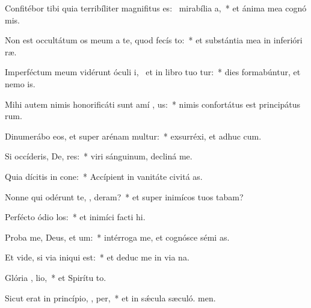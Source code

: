 \item Confitébor tibi quia terribíliter magnifitus es:~\pscross{} mirabília  a,~* et ánima mea cognó mis.
\item Non est occultátum os meum a te, quod fecís  to:~* et substántia mea in inferióri ræ.
\item Imperféctum meum vidérunt óculi i,~\pscross{} et in libro tuo  tur:~* dies formabúntur, et nemo  is.
\item Mihi autem nimis honorificáti sunt amí , us:~* nimis confortátus est principátus rum.
\item Dinumerábo eos, et super arénam multur:~* exsurréxi, et adhuc  cum.
\item Si occíderis, De, res:~* viri sánguinum, decliná  me.
\item Quia dícitis in cone:~* Accípient in vanitáte civitá as.
\item Nonne qui odérunt te, , deram?~* et super inimícos tuos tabam?
\item Perfécto ódio  los:~* et inimíci facti  hi.
\item Proba me, Deus, et   um:~* intérroga me, et cognósce sémi as.
\item Et vide, si via iniqui   est:~* et deduc me in via na.
\item Glória ,  lio,~* et Spirítu to.
\item Sicut erat in princípio,  ,  per,~* et in sǽcula sæculó. men.
